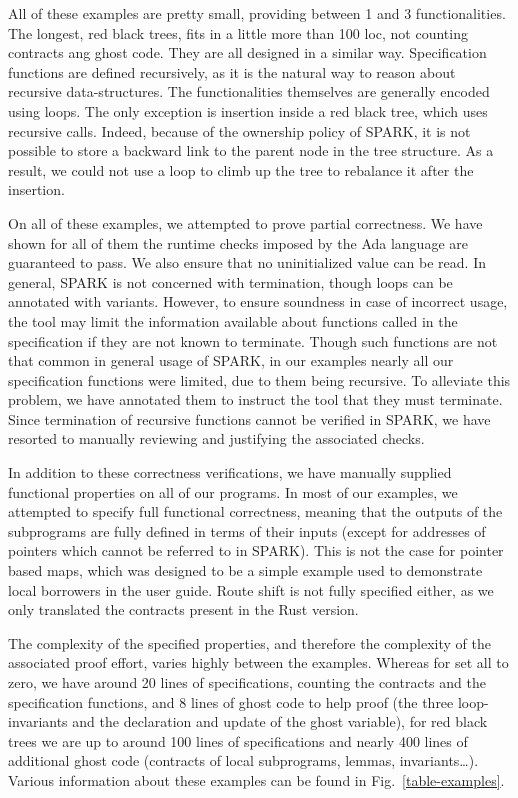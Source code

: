 \documentclass[runningheads]{llncs}
\begin{document}
All of these examples are pretty small, providing between 1 and 3 functionalities. The longest, red black trees, fits in a little more than 100 loc, not counting contracts ang ghost code. They are all designed in a similar way. Specification functions are defined recursively, as it is the natural way to reason about recursive data-structures. The functionalities themselves are generally encoded using loops. The only exception is insertion inside a red black tree, which uses recursive calls. Indeed, because of the ownership policy of SPARK, it is not possible to store a backward link to the parent node in the tree structure. As a result, we could not use a loop to climb up the tree to rebalance it after the insertion.

On all of these examples, we attempted to prove partial correctness. We have shown for all of them the runtime checks imposed by the Ada language are guaranteed to pass. We also ensure that no uninitialized value can be read. In general, SPARK is not concerned with termination, though loops can be annotated with variants. However, to ensure soundness in case of incorrect usage, the tool may limit the information available about functions called in the specification if they are not known to terminate. Though such functions are not that common in general usage of SPARK, in our examples nearly all our specification functions were limited, due to them being recursive. To alleviate this problem, we have annotated them to instruct the tool that they must terminate. Since termination of recursive functions cannot be verified in SPARK, we have resorted to manually reviewing and justifying the associated checks.

In addition to these correctness verifications, we have manually supplied functional properties on all of our programs. In most of our examples, we attempted to specify full functional correctness, meaning that the outputs of the subprograms are fully defined in terms of their inputs (except for addresses of pointers which cannot be referred to in SPARK). This is not the case for pointer based maps, which was designed to be a simple example used to demonstrate local borrowers in the user guide. Route shift is not fully specified either, as we only translated the contracts present in the Rust version.

The complexity of the specified properties, and therefore the complexity of the associated proof effort, varies highly between the examples. Whereas for set all to zero, we have around 20 lines of specifications, counting the contracts and the specification functions, and 8 lines of ghost code to help proof (the three loop-invariants and the declaration and update of the ghost variable), for red black trees we are up to around 100 lines of specifications and nearly 400 lines of additional ghost code (contracts of local subprograms, lemmas, invariants…). Various information about these examples can be found in Fig.~\ref{table-examples}.
\end{document}
